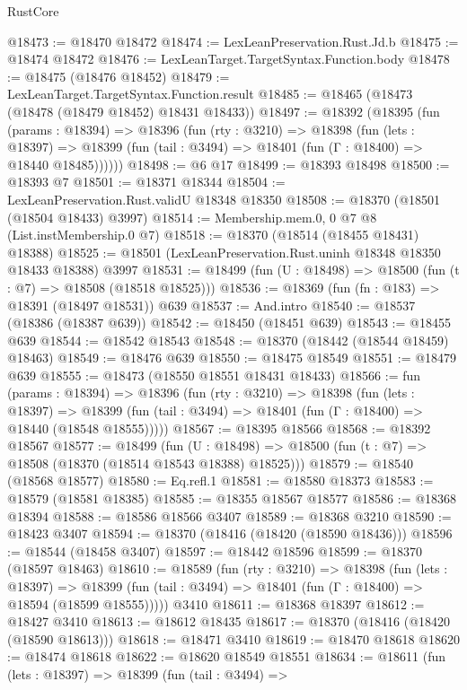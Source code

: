 \begin{lexlean}{RustCore}
\begin{coremodule}
@18473 := @18470 @18472
@18474 := LexLeanPreservation.Rust.Jd.b
@18475 := @18474 @18472
@18476 := LexLeanTarget.TargetSyntax.Function.body
@18478 := @18475 (@18476 @18452)
@18479 := LexLeanTarget.TargetSyntax.Function.result
@18485 := @18465 (@18473 (@18478 (@18479 @18452) @18431 @18433))
@18497 := @18392
    (@18395
      (fun (params : @18394) =>
      @18396
        (fun (rty : @3210) =>
        @18398
          (fun (lets : @18397) =>
          @18399 (fun (tail : @3494) => @18401 (fun (Γ : @18400) => @18440 @18485))))))
@18498 := @6 @17
@18499 := @18393 @18498
@18500 := @18393 @7
@18501 := @18371 @18344
@18504 := LexLeanPreservation.Rust.validU @18348 @18350
@18508 := @18370 (@18501 (@18504 @18433) @3997)
@18514 := Membership.mem.{0, 0} @7 @8 (List.instMembership.{0} @7)
@18518 := @18370 (@18514 (@18455 @18431) @18388)
@18525 := @18501 (LexLeanPreservation.Rust.uninh @18348 @18350 @18433 @18388) @3997
@18531 := @18499 (fun (U : @18498) => @18500 (fun (t : @7) => @18508 (@18518 @18525)))
@18536 := @18369 (fun (fn : @183) => @18391 (@18497 @18531)) @639
@18537 := And.intro
@18540 := @18537 (@18386 (@18387 @639))
@18542 := @18450 (@18451 @639)
@18543 := @18455 @639
@18544 := @18542 @18543
@18548 := @18370 (@18442 (@18544 @18459) @18463)
@18549 := @18476 @639
@18550 := @18475 @18549
@18551 := @18479 @639
@18555 := @18473 (@18550 @18551 @18431 @18433)
@18566 := fun (params : @18394) =>
  @18396
    (fun (rty : @3210) =>
    @18398
      (fun (lets : @18397) =>
      @18399 (fun (tail : @3494) => @18401 (fun (Γ : @18400) => @18440 (@18548 @18555)))))
@18567 := @18395 @18566
@18568 := @18392 @18567
@18577 := @18499
    (fun (U : @18498) => @18500 (fun (t : @7) => @18508 (@18370 (@18514 @18543 @18388) @18525)))
@18579 := @18540 (@18568 @18577)
@18580 := Eq.refl.{1}
@18581 := @18580 @18373
@18583 := @18579 (@18581 @18385)
@18585 := @18355 @18567 @18577
@18586 := @18368 @18394
@18588 := @18586 @18566 @3407
@18589 := @18368 @3210
@18590 := @18423 @3407
@18594 := @18370 (@18416 (@18420 (@18590 @18436)))
@18596 := @18544 (@18458 @3407)
@18597 := @18442 @18596
@18599 := @18370 (@18597 @18463)
@18610 := @18589
    (fun (rty : @3210) =>
    @18398
      (fun (lets : @18397) =>
      @18399 (fun (tail : @3494) => @18401 (fun (Γ : @18400) => @18594 (@18599 @18555)))))
    @3410
@18611 := @18368 @18397
@18612 := @18427 @3410
@18613 := @18612 @18435
@18617 := @18370 (@18416 (@18420 (@18590 @18613)))
@18618 := @18471 @3410
@18619 := @18470 @18618
@18620 := @18474 @18618
@18622 := @18620 @18549 @18551
@18634 := @18611
    (fun (lets : @18397) =>
    @18399
      (fun (tail : @3494) =>

\end{coremodule}
\end{lexlean}
